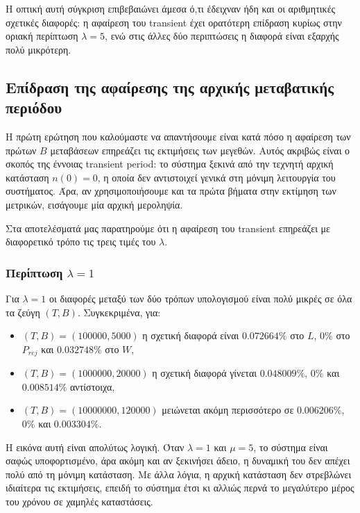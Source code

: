 \documentclass{article}
\begin{document}
Η οπτική αυτή σύγκριση επιβεβαιώνει άμεσα ό,τι έδειχναν ήδη και οι αριθμητικές σχετικές διαφορές: η αφαίρεση του transient έχει ορατότερη επίδραση κυρίως στην οριακή περίπτωση $\lambda=5$, ενώ στις άλλες δύο περιπτώσεις η διαφορά είναι εξαρχής πολύ μικρότερη.

\subsection{Επίδραση της αφαίρεσης της αρχικής μεταβατικής περιόδου}

Η πρώτη ερώτηση που καλούμαστε να απαντήσουμε είναι κατά πόσο η αφαίρεση των πρώτων $B$ μεταβάσεων επηρεάζει τις εκτιμήσεις των μεγεθών. Αυτός ακριβώς είναι ο σκοπός της έννοιας \foreignlanguage{english}{transient period}: το σύστημα ξεκινά από την τεχνητή αρχική κατάσταση $n(0)=0$, η οποία δεν αντιστοιχεί γενικά στη μόνιμη λειτουργία του συστήματος. Άρα, αν χρησιμοποιήσουμε και τα πρώτα βήματα στην εκτίμηση των μετρικών, εισάγουμε μία αρχική μεροληψία.

Στα αποτελέσματά μας παρατηρούμε ότι η αφαίρεση του transient επηρεάζει με διαφορετικό τρόπο τις τρεις τιμές του $\lambda$.

\subsubsection*{Περίπτωση $\lambda=1$}

Για $\lambda=1$ οι διαφορές μεταξύ των δύο τρόπων υπολογισμού είναι πολύ μικρές σε όλα τα ζεύγη $(T,B)$. Συγκεκριμένα, για:
\begin{itemize}
    \item $(T,B)=(100000,5000)$ η σχετική διαφορά είναι $0.072664\%$ στο $L$, $0\%$ στο $P_{rej}$ και $0.032748\%$ στο $W$,
    \item $(T,B)=(1000000,20000)$ η σχετική διαφορά γίνεται $0.048009\%$, $0\%$ και $0.008514\%$ αντίστοιχα,
    \item $(T,B)=(10000000,120000)$ μειώνεται ακόμη περισσότερο σε $0.006206\%$, $0\%$ και $0.003304\%$.
\end{itemize}

Η εικόνα αυτή είναι απολύτως λογική. Όταν $\lambda=1$ και $\mu=5$, το σύστημα είναι σαφώς υποφορτισμένο, άρα ακόμη και αν ξεκινήσει άδειο, η δυναμική του δεν απέχει πολύ από τη μόνιμη κατάσταση. Με άλλα λόγια, η αρχική κατάσταση δεν στρεβλώνει ιδιαίτερα τις εκτιμήσεις, επειδή το σύστημα έτσι κι αλλιώς περνά το μεγαλύτερο μέρος του χρόνου σε χαμηλές καταστάσεις.
\end{document}
